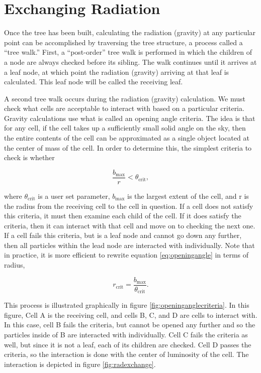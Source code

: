 \section{Exchanging Radiation}
\label{sec:exchangerad}

Once the tree has been built, calculating the radiation (gravity) at any particular point can be accomplished by traversing the tree structure, a process called a ``tree walk.'' First, a ``post-order'' tree walk is performed in which the children of a node are always checked before its sibling. The walk continues until it arrives at a leaf node, at which point the radiation (gravity) arriving at that leaf is calculated. This leaf node will be called the receiving leaf.

A second tree walk occurs during the radiation (gravity) calculation. We must check what cells are acceptable to interact with based on a particular criteria. Gravity calculations use what is called an opening angle criteria. The idea is that for any cell, if the cell takes up a sufficiently small solid angle on the sky, then the entire contents of the cell can be approximated as a single object located at the center of mass of the cell. In order to determine this, the simplest criteria to check is whether

\begin{equation}
\label{eq:openingangle}
\frac{b_{\mbox{max}}}{r} < \theta_{\mbox{crit}},
\end{equation}

where $\theta_{\mbox{crit}}$ is a user set parameter, $b_{\mbox{max}}$ is the largest extent of the cell, and r is the radius from the receiving cell to the cell in question. If a cell does not satisfy this criteria, it must then examine each child of the cell. If it does satisfy the criteria, then it can interact with that cell and move on to checking the next one. If a cell fails this criteria, but is a leaf node and cannot go down any further, then all particles within the lead node are interacted with individually. Note that in practice, it is more efficient to rewrite equation \ref{eq:openingangle} in terms of radius,

\begin{equation}
\label{eq:openingradius}
r_{\mbox{crit}} = \frac{b_{\mbox{max}}}{\theta_{\mbox{crit}}}.
\end{equation}

This process is illustrated graphically in figure \ref{fig:openinganglecriteria}. In this figure, Cell A is the receiving cell, and cells B, C, and D are cells to interact with. In this case, cell B fails the criteria, but cannot be opened any further and so the particles inside of B are interacted with individually. Cell C fails the criteria as well, but since it is not a leaf, each of its children are checked. Cell D passes the criteria, so the interaction is done with the center of luminosity of the cell. The interaction is depicted in figure \ref{fig:radexchange}.

